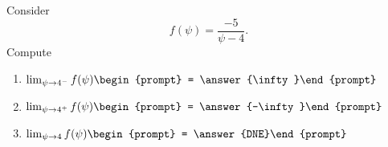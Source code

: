 \documentclass{ximera}
\author{Bart Snapp}
\begin{document}
\begin{exercise}
Consider 
\[
f(\psi) = \frac{-5}{\psi -4}.
\]
Compute
\begin{enumerate}
\item $\lim_{\psi\to 4^- } f(\psi) \begin{prompt} = \answer{\infty}\end{prompt}$
\item $\lim_{\psi\to 4^+ } f(\psi) \begin{prompt} = \answer{-\infty}\end{prompt}$
\item $\lim_{\psi\to 4 } f(\psi) \begin{prompt} = \answer{DNE}\end{prompt}$
\end{enumerate}
\end{exercise}
\end{document}
